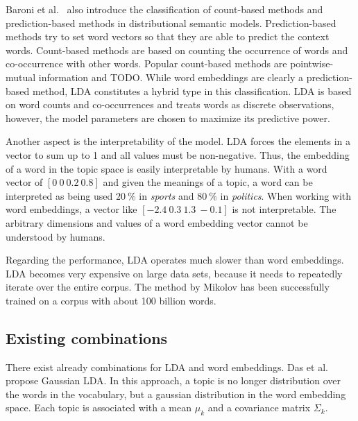 \documentclass{sig-alternate-05-2015}
\begin{document}
Baroni et al.~\cite{Baroni2014} also introduce the classification of count-based methods and prediction-based methods in distributional semantic models.
Prediction-based methods try to set word vectors so that they are able to predict the context words.
Count-based methods are based on counting the occurrence of words and co-occurrence with other words.
Popular count-based methods are pointwise-mutual information and TODO.
While word embeddings are clearly a prediction-based method, LDA constitutes a hybrid type in this classification.
LDA is based on word counts and co-occurrences and treats words as discrete observations, however, the model parameters are chosen to maximize its predictive power.

Another aspect is the interpretability of the model.
LDA forces the elements in a vector to sum up to 1 and all values must be non-negative.
Thus, the embedding of a word in the topic space is easily interpretable by humans.
With a word vector of $[0~0~0.2~0.8]$ and given the meanings of a topic, a word can be interpreted as being used $20~\%$ in \emph{sports} and $80~\%$ in \emph{politics}.
When working with word embeddings, a vector like $[-2.4~0.3~1.3~-0.1]$ is not interpretable.
The arbitrary dimensions and values of a word embedding vector cannot be understood by humans.

Regarding the performance, LDA operates much slower than word embeddings.
LDA becomes very expensive on large data sets, because it needs to repeatedly iterate over the entire corpus.
The method by Mikolov has been successfully trained on a corpus with about 100 billion words.


\subsection{Existing combinations}
There exist already combinations for LDA and word embeddings.
Das et al.~\cite{Das2015} propose Gaussian LDA.
In this approach, a topic is no longer distribution over the words in the vocabulary, but a gaussian distribution in the word embedding space.
Each topic is associated with a mean $\mu_k$ and a covariance matrix $\Sigma_k$.


\end{document}
